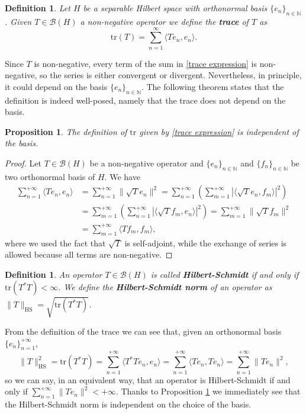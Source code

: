 \documentclass[corpo=11pt, stile=classica, tipotesi=custom,
greek, evenboxes, english]{toptesi}
\numberwithin{equation}{chapter}
\newtheorem{defi}[teo]{Definition}
\newtheorem{prop}[teo]{Proposition}
\theoremstyle{definition}
\theoremstyle{remark}
\newcommand{\N}{\mathbb{N}} %
\newcommand{\B}{\mathscr{B}} %
\begin{document}
\begin{defi}\label{trace def}
	Let $H$ be a separable Hilbert space with orthonormal basis $\{e_n\}_{n \in \N}$. Given $T \in \B(H)$ a non-negative operator we define the \textbf{trace} of $T$ as
	\begin{equation}\label{trace expression}
		\mathrm{tr}(T) = \sum_{n=1}^{\infty} \langle T e_n, e_n \rangle.
	\end{equation}
\end{defi}
Since $T$ is non-negative, every term of the sum in \eqref{trace expression} is non-negative, so the series is either convergent or divergent. Nevertheless, in principle, it could depend on the basis $\{e_n\}_{n \in \N}$. The following theorem states that the definition is indeed well-posed, namely that the trace does not depend on the basis.
\begin{prop}\label{trace is well-defined}
	The definition of $\mathrm{tr}$ given by \eqref{trace expression} is independent of the basis.
\end{prop}
\begin{proof}
	Let $T \in \B(H)$ be a non-negative operator and $\{e_n\}_{n \in \N}$ and $\{f_n\}_{n \in \N}$ be two orthonormal basis of $H$. We have
	\begin{align*}
		\sum_{n=1}^{+\infty} \langle Te_n,e_n \rangle &= \sum_{n=1}^{+\infty} \|\sqrt{T}e_n\|^2 = \sum_{n=1}^{+\infty} \left(\sum_{m=1}^{+\infty} |\langle \sqrt{T}e_n, f_m \rangle|^2 \right)\\
															&= \sum_{m=1}^{+\infty} \left(\sum_{n=1}^{+\infty} |\langle \sqrt{T}f_m, e_n \rangle|^2 \right) = \sum_{m=1}^{+\infty} \|\sqrt{T}f_m\|^2 \\
															&= \sum_{m=1}^{+\infty} \langle T f_m, f_m \rangle,
	\end{align*}
	where we used the fact that $\sqrt{T}$ is self-adjoint, while the exchange of series is allowed because all terms are non-negative.
\end{proof}
\begin{defi}\label{Hilbert-Schmidt operator def}
	An operator $T \in \B(H)$ is called \textbf{Hilbert-Schmidt} if and only if $\mathrm{tr}(T^*T) < \infty$. We define the \textbf{Hilbert-Schmidt norm} of an operator as $\|T\|_{\mathrm{HS}} = \sqrt{\mathrm{tr}(T^*T)}$.
\end{defi}
From the definition of the trace we can see that, given an orthonormal basis $\{e_n\}_{n=1}^{+\infty}$,
\begin{equation}\label{Hilbert-Schmidt norm expression}
	\|T\|_{\mathrm{HS}}^2 = \mathrm{tr}(T^*T) = \sum_{n=1}^{+\infty} \langle T^*Te_n,e_n \rangle = \sum_{n=1}^{+\infty} \langle Te_n,Te_n \rangle = \sum_{n=1}^{+\infty} \|Te_n\|^2,
\end{equation}
so we can say, in an equivalent way, that an operator is Hilbert-Schmidt if and only if $\sum_{n=1}^{+\infty} \|Te_n\|^2 < +\infty$. Thanks to Proposition \ref{trace is well-defined} we immediately see that the Hilbert-Schmidt norm is independent on the choice of the basis.
\end{document}

